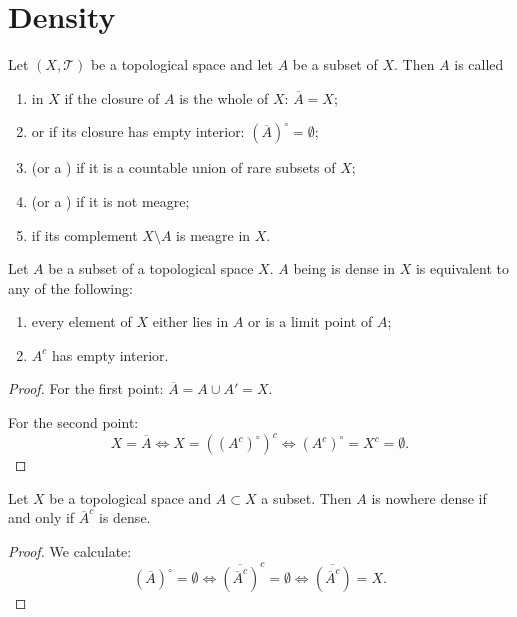 \section{Density}
\begin{definition}
Let $(X,\mathcal{T})$ be a topological space and let $A$ be a subset of $X$. Then $A$ is called
\begin{enumerate}
\item {} in $X$ if the closure of $A$ is the whole of $X$: $\overline{A} = X$;
\item {} or  if its closure has empty interior: $(\overline{A})^\circ = \emptyset$;
\item {} (or a ) if it is a countable union of rare subsets of $X$;
\item {} (or a ) if it is not meagre;
\item {} if its complement $X\setminus A$ is meagre in $X$.
\end{enumerate}
\end{definition}
\begin{lemma} \label{densityEquivalences}
Let $A$ be a subset of a topological space $X$. $A$ being is dense in $X$ is equivalent to any of the following:
\begin{enumerate}
\item every element of $X$ either lies in $A$ or is a limit point of $A$;
\item $A^c$ has empty interior.
\end{enumerate}
\end{lemma}
\begin{proof}
For the first point: $\overline{A} = A\cup A' = X$.

For the second point:
\[ X = \overline{A} \iff X = ((A^c)^\circ)^c \iff (A^c)^\circ = X^c = \emptyset. \]
\end{proof}

\begin{lemma} \label{nowhereDensityEquivalence}
Let $X$ be a topological space and $A\subset X$ a subset. Then $A$ is nowhere dense \textup{if and only if} $\overline{A}^c$ is dense.
\end{lemma}
\begin{proof}
We calculate:
\[ (\overline{A})^\circ = \emptyset \iff \overline{(\overline{A}^c)}^c = \emptyset \iff \overline{(\overline{A}^c)} = X. \]
\end{proof}

